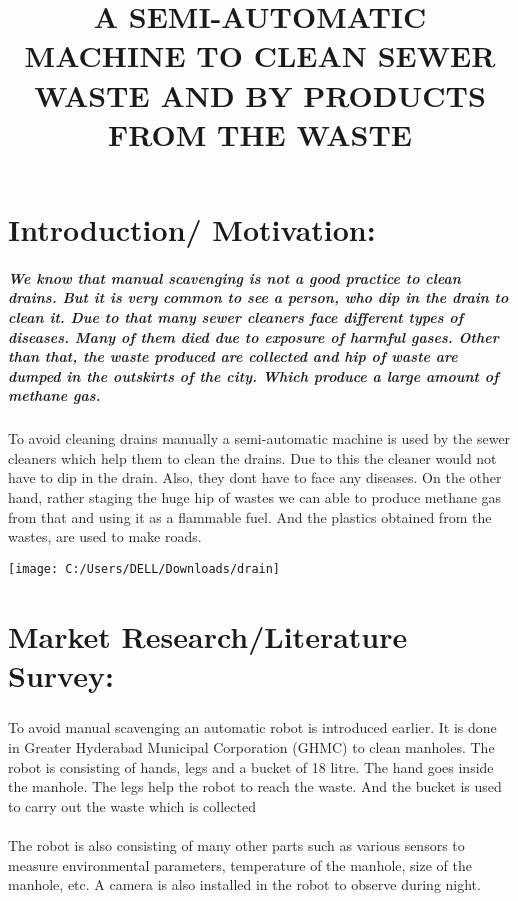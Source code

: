 \documentclass[]{article}
\title{A SEMI-AUTOMATIC MACHINE TO CLEAN SEWER WASTE AND BY PRODUCTS FROM THE WASTE}
\author{}
\begin{document}
\maketitle



\section{Introduction/ Motivation:}
\subparagraph{We know that manual scavenging is not a good practice to clean drains. But it is very common to see a person, who dip in the drain to clean it. Due to that many sewer cleaners face different types of diseases. Many of them died due to exposure of harmful gases. Other than that, the waste produced are collected and hip of waste are dumped in the outskirts of the city. Which produce a large amount of methane gas. }
\paragraph{}
To avoid cleaning drains manually a semi-automatic machine is used by the sewer cleaners which help them to clean the drains. Due to this the cleaner would not have to dip in the drain. Also, they dont have to face any diseases. On the other hand, rather staging the huge hip of wastes we can able to produce methane gas from that and using it as a flammable fuel. And the plastics obtained from the wastes, are used to make roads.

\begin{center}
	\texttt{[image: C:/Users/DELL/Downloads/drain]}
\end{center}
	
\section{Market Research/Literature Survey:}
\subparagraph{}
To avoid manual scavenging an automatic robot is introduced earlier. It is done in Greater Hyderabad Municipal Corporation (GHMC) to clean manholes. The robot is consisting of hands, legs and a bucket of 18 litre. The hand goes inside the manhole. The legs help the robot to reach the waste. And the bucket is used to carry out the waste which is collected
\paragraph{}
The robot is also consisting of many other parts such as various sensors to measure environmental parameters, temperature of the manhole, size of the manhole, etc. A camera is also installed in the robot to observe during night. 
\end{document}
